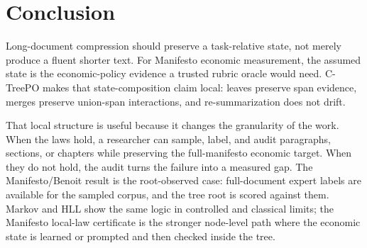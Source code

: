 \section{Conclusion}\label{sec:min-conclusion}

Long-document compression should preserve a task-relative state, not
merely produce a fluent shorter text. For Manifesto
economic measurement, the assumed state is the economic-policy evidence a
trusted rubric oracle would need. C-TreePO makes that state-composition claim
local: leaves preserve span evidence, merges preserve union-span interactions,
and re-summarization does not drift.

That local structure is useful because it changes the granularity of the work.
When the laws hold, a researcher can sample, label, and audit paragraphs,
sections, or chapters while preserving the full-manifesto economic target.
When they do not hold, the audit turns the failure into a measured gap. The
Manifesto/Benoit result is the root-observed case: full-document expert
labels are available for the sampled corpus, and the tree root is scored
against them. Markov and HLL show the same logic in controlled and classical
limits; the Manifesto local-law certificate is the stronger node-level path
where the economic state is learned or prompted and then checked inside the
tree.
